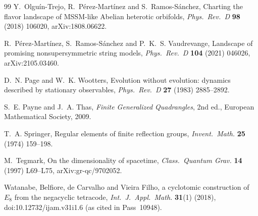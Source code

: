 \begin{thebibliography}{99}
 Y.~Olgu\'in-Trejo, R.~P\'erez-Mart\'inez and S.~Ramos-S\'anchez, Charting the
flavor landscape of MSSM-like Abelian heterotic orbifolds, \emph{Phys.\ Rev.\ D} \textbf{98} (2018) 106020,
arXiv:1808.06622.

 R.~P\'erez-Mart\'inez, S.~Ramos-S\'anchez and P.~K.~S. Vaudrevange, Landscape of
promising nonsupersymmetric string models, \emph{Phys.\ Rev.\ D} \textbf{104} (2021) 046026, arXiv:2105.03460.

 D.~N. Page and W.~K. Wootters, Evolution without evolution: dynamics
described by stationary observables, \emph{Phys.\ Rev.\ D} \textbf{27} (1983) 2885--2892.

 S.~E. Payne and J.~A. Thas, \emph{Finite Generalized Quadrangles}, 2nd
ed., European Mathematical Society, 2009.

 T.~A. Springer, Regular elements of finite reflection groups,
\emph{Invent.\ Math.} \textbf{25} (1974) 159--198.

 M.~Tegmark, On the dimensionality of spacetime, \emph{Class.\ Quantum
Grav.} \textbf{14} (1997) L69--L75, arXiv:gr-qc/9702052.

 Watanabe, Belfiore, de Carvalho and Vieira Filho, a cyclotomic
construction of $E_8$ from the negacyclic tetracode, \emph{Int.\ J.\ Appl.\ Math.}
\textbf{31}(1) (2018), doi:10.12732/ijam.v31i1.6 (as cited in Pass~10948).


\end{thebibliography}
